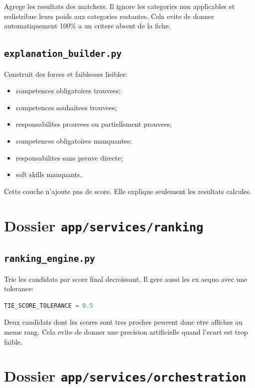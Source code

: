 \documentclass[12pt,a4paper]{article}
\begin{document}
Agrege les resultats des matchers. Il ignore les categories non applicables et redistribue leurs poids aux categories restantes. Cela evite de donner automatiquement 100\% a un critere absent de la fiche.

\subsection{\texttt{explanation\_builder.py}}

Construit des forces et faiblesses lisibles:

\begin{itemize}
  \item competences obligatoires trouvees;
  \item competences souhaitees trouvees;
  \item responsabilites prouvees ou partiellement prouvees;
  \item competences obligatoires manquantes;
  \item responsabilites sans preuve directe;
  \item soft skills manquants.
\end{itemize}

Cette couche n'ajoute pas de score. Elle explique seulement les resultats calcules.

\section{Dossier \texttt{app/services/ranking}}

\subsection{\texttt{ranking\_engine.py}}

Trie les candidats par score final decroissant. Il gere aussi les ex aequo avec une tolerance:

\begin{lstlisting}[style=smartcode,language=Python]
TIE_SCORE_TOLERANCE = 0.5
\end{lstlisting}

Deux candidats dont les scores sont tres proches peuvent donc etre affiches au meme rang. Cela evite de donner une precision artificielle quand l'ecart est trop faible.

\section{Dossier \texttt{app/services/orchestration}}
\end{document}
